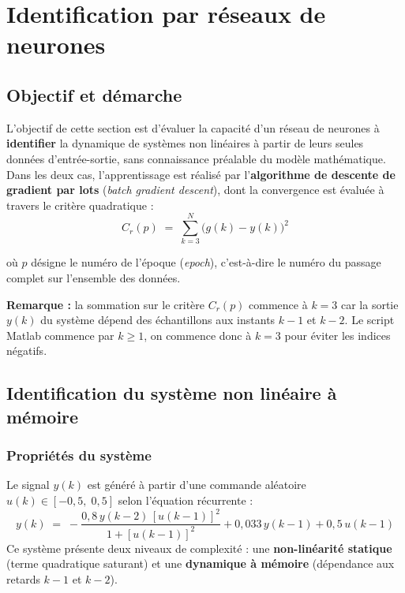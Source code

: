 \section{Identification par réseaux de neurones}

\subsection{Objectif et démarche}

L'objectif de cette section est d'évaluer la capacité d'un réseau de neurones à \textbf{identifier} la dynamique de systèmes non linéaires à partir de leurs seules données d'entrée-sortie, sans connaissance préalable du modèle mathématique. Dans les deux cas, l'apprentissage est réalisé par l'\textbf{algorithme de descente de gradient par lots} (\textit{batch gradient descent}), dont la convergence est évaluée à travers le critère quadratique :
\[
C_r(p) \;=\; \sum_{k=3}^{N} \bigl(g(k) - y(k)\bigr)^2
\]

où $p$ désigne le numéro de l'époque (\textit{epoch}), c'est-à-dire le numéro du passage complet sur l'ensemble des données.

\textbf{Remarque :} la sommation sur le critère $C_r(p)$ commence à $k = 3$ car la sortie $y(k)$ du système dépend des échantillons aux instants $k-1$ et $k-2$. Le script Matlab commence par $k \geq 1$, on commence donc à $k = 3$ pour éviter les indices négatifs.

\subsection{Identification du système non linéaire à mémoire}

\subsubsection{Propriétés du système}

Le signal $y(k)$ est généré à partir d'une commande aléatoire $u(k) \in [-0{,}5,\; 0{,}5]$ selon l'équation récurrente :
\begin{equation}
	y(k) \;=\; -\frac{0{,}8\,y(k-2)\,[u(k-1)]^2}
	{1 + [u(k-1)]^2}
	+ 0{,}033\,y(k-1) + 0{,}5\,u(k-1)
	\label{eq:sys_memoire}
\end{equation}
Ce système présente deux niveaux de complexité : une \textbf{non-linéarité statique} (terme quadratique saturant) et une \textbf{dynamique à mémoire} (dépendance aux retards $k-1$ et $k-2$).

